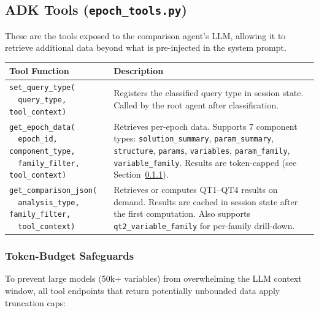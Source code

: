 \documentclass[11pt, a4paper]{article}
\begin{document}
\subsection{ADK Tools (\texttt{epoch\_tools.py})}

These are the tools exposed to the comparison agent's LLM, allowing it to
retrieve additional data beyond what is pre-injected in the system prompt.

\begin{longtable}{p{5cm} p{9.5cm}}
\toprule
\textbf{Tool Function} & \textbf{Description} \\
\midrule
\texttt{set\_query\_type(\\ ~~query\_type, tool\_context)} &
    Registers the classified query type in session state.  Called by
    the root agent after classification. \\
\midrule
\texttt{get\_epoch\_data(\\ ~~epoch\_id, component\_type,\\ ~~family\_filter, tool\_context)} &
    Retrieves per-epoch data.  Supports 7 component types:
    \texttt{solution\_summary}, \texttt{param\_summary},
    \texttt{structure}, \texttt{params}, \texttt{variables},
    \texttt{param\_family}, \texttt{variable\_family}.
    Results are token-capped (see Section~\ref{sec:safeguards}). \\
\midrule
\texttt{get\_comparison\_json(\\ ~~analysis\_type, family\_filter,\\ ~~tool\_context)} &
    Retrieves or computes QT1--QT4 results on demand.  Results are
    cached in session state after the first computation.  Also supports
    \texttt{qt2\_variable\_family} for per-family drill-down. \\
\bottomrule
\end{longtable}

\subsubsection{Token-Budget Safeguards}
\label{sec:safeguards}

To prevent large models (50k+ variables) from overwhelming the LLM context
window, all tool endpoints that return potentially unbounded data apply
truncation caps:
\end{document}
